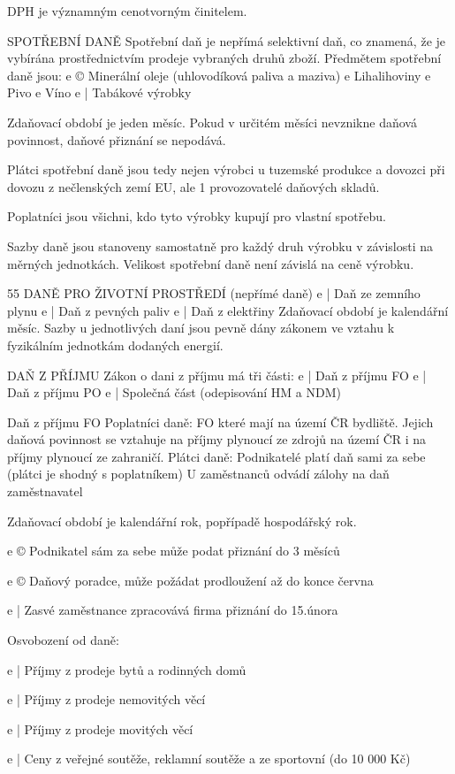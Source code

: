 DPH je významným cenotvorným činitelem.

SPOTŘEBNÍ DANĚ
Spotřební daň je nepřímá selektivní daň, co znamená, že je vybírána prostřednictvím prodeje
vybraných druhů zboží.
Předmětem spotřební daně jsou:
e © Minerální oleje (uhlovodíková paliva a maziva)
e Lihalihoviny
e Pivo
e Víno
e | Tabákové výrobky

Zdaňovací období je jeden měsíc. Pokud v určitém měsíci nevznikne daňová povinnost,
daňové přiznání se nepodává.

Plátci spotřební daně jsou tedy nejen výrobci u tuzemské produkce a dovozci při dovozu
z nečlenských zemí EU, ale 1 provozovatelé daňových skladů.

Poplatníci jsou všichni, kdo tyto výrobky kupují pro vlastní spotřebu.

Sazby daně jsou stanoveny samostatně pro každý druh výrobku v závislosti na měrných
jednotkách. Velikost spotřební daně není závislá na ceně výrobku.

55
\newpage
DANĚ PRO ŽIVOTNÍ PROSTŘEDÍ (nepřímé daně)
e | Daň ze zemního plynu
e | Daň z pevných paliv
e | Daň z elektřiny
Zdaňovací období je kalendářní měsíc.
Sazby u jednotlivých daní jsou pevně dány zákonem ve vztahu k fyzikálním jednotkám
dodaných energií.

DAŇ Z PŘÍJMU
Zákon o dani z příjmu má tři části:
e | Daň z příjmu FO
e | Daň z příjmu PO
e | Společná část (odepisování HM a NDM)

Daň z příjmu FO
Poplatníci daně: FO které mají na území ČR bydliště. Jejich daňová povinnost se vztahuje
na příjmy plynoucí ze zdrojů na území ČR i na příjmy plynoucí ze zahraničí.
Plátci daně: Podnikatelé platí daň sami za sebe (plátci je shodný s poplatníkem)
U zaměstnanců odvádí zálohy na daň zaměstnavatel

Zdaňovací období je kalendářní rok, popřípadě hospodářský rok.

e © Podnikatel sám za sebe může podat přiznání do 3 měsíců

e © Daňový poradce, může požádat prodloužení až do konce června

e | Zasvé zaměstnance zpracovává firma přiznání do 15.února

Osvobození od daně:

e | Příjmy z prodeje bytů a rodinných domů

e | Příjmy z prodeje nemovitých věcí

e | Příjmy z prodeje movitých věcí

e | Ceny z veřejné soutěže, reklamní soutěže a ze sportovní (do 10 000 Kč)

